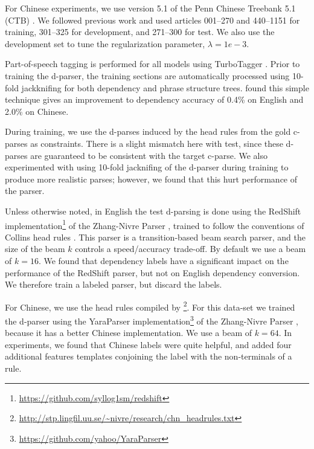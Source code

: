 \documentclass[11pt,letterpaper]{article}
\newcommand{\nascomment}[1]{\textcolor{blue}{\bf \small [#1 --nas]}}
\begin{document}
For Chinese experiments, we use version 5.1 of the Penn  Chinese Treebank 5.1 (CTB) \cite{xue2005penn}. We followed previous work and used
articles 001--270 and 440--1151 for training, 
301--325 for development, and 
271--300 for test. We also use the development set to tune the regularization parameter, $\lambda=1e-3$.

Part-of-speech tagging is performed for all models using TurboTagger
\cite{martins2013turning}.  Prior to training the d-parser, the
training sections are automatically processed using 10-fold
jackknifing \cite{collins2005discriminative} for both dependency and phrase
structure trees.  found this simple technique
gives an improvement to dependency accuracy of 0.4\% on English and
2.0\% on Chinese. 

During training, we use the d-parses induced by the head rules from
the gold c-parses as constraints. There is a slight mismatch here with
test, since these d-parses are guaranteed to be consistent with the
target c-parse. We also experimented with using 10-fold jacknifing of
the d-parser during training to produce more realistic parses; however, 
we found that this hurt performance of the parser.


Unless otherwise noted, in English the test d-parsing is done using
the RedShift
implementation\footnote{\url{https://github.com/syllog1sm/redshift}}
of the Zhang-Nivre Parser \cite{zhang2011transition}, trained to
follow the conventions of Collins head rules
\cite{collins2003head}. This parser is a transition-based beam search
parser, and the size of the beam $k$ controls a speed/accuracy
trade-off.  By default we use a beam of $k=16$.  We found that
dependency labels have a significant impact on the performance of the
RedShift parser, but not on English dependency conversion. We therefore train
a labeled parser, but discard the labels.

For Chinese, we use the head rules compiled by
\footnote{\url{http://stp.lingfil.uu.se/~nivre/research/chn_headrules.txt}}.
For this data-set we trained the d-parser using the YaraParser implementation\footnote{\url{https://github.com/yahoo/YaraParser}}
of the Zhang-Nivre Parser \cite{zhang2011transition}, because it has a better Chinese implementation. 
We use a beam of $k=64$.
In experiments, we found that Chinese labels were quite helpful, and added four
additional features templates conjoining the label with the
non-terminals of a rule.
\end{document}
